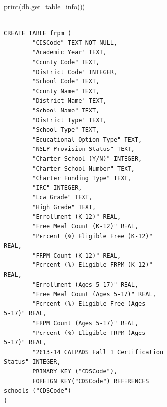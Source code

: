 \documentclass[
  letterpaper,
  DIV=11,
  numbers=noendperiod]{scrartcl}
\newenvironment{Shaded}{\begin{snugshade}}{\end{snugshade}}
\newcommand{\BuiltInTok}[1]{\textcolor[rgb]{0.00,0.23,0.31}{#1}}
\newcommand{\NormalTok}[1]{\textcolor[rgb]{0.00,0.23,0.31}{#1}}
\begin{document}
\begin{Shaded}
\begin{Highlighting}[]
\BuiltInTok{print}\NormalTok{(db.get\_table\_info())}
\end{Highlighting}
\end{Shaded}

\begin{verbatim}

CREATE TABLE frpm (
        "CDSCode" TEXT NOT NULL, 
        "Academic Year" TEXT, 
        "County Code" TEXT, 
        "District Code" INTEGER, 
        "School Code" TEXT, 
        "County Name" TEXT, 
        "District Name" TEXT, 
        "School Name" TEXT, 
        "District Type" TEXT, 
        "School Type" TEXT, 
        "Educational Option Type" TEXT, 
        "NSLP Provision Status" TEXT, 
        "Charter School (Y/N)" INTEGER, 
        "Charter School Number" TEXT, 
        "Charter Funding Type" TEXT, 
        "IRC" INTEGER, 
        "Low Grade" TEXT, 
        "High Grade" TEXT, 
        "Enrollment (K-12)" REAL, 
        "Free Meal Count (K-12)" REAL, 
        "Percent (%) Eligible Free (K-12)" 
REAL, 
        "FRPM Count (K-12)" REAL, 
        "Percent (%) Eligible FRPM (K-12)" 
REAL, 
        "Enrollment (Ages 5-17)" REAL, 
        "Free Meal Count (Ages 5-17)" REAL, 
        "Percent (%) Eligible Free (Ages 
5-17)" REAL, 
        "FRPM Count (Ages 5-17)" REAL, 
        "Percent (%) Eligible FRPM (Ages 
5-17)" REAL, 
        "2013-14 CALPADS Fall 1 Certification
Status" INTEGER, 
        PRIMARY KEY ("CDSCode"), 
        FOREIGN KEY("CDSCode") REFERENCES 
schools ("CDSCode")
)


\end{verbatim}
\end{document}
